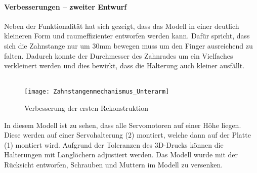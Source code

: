\documentclass[titlepage,12pt,twoside]{article}
\begin{document}
\paragraph{Verbesserungen – zweiter Entwurf}
\hfill \break
\hfill \break
Neben der Funktionalität hat sich gezeigt, dass das Modell in einer deutlich kleineren Form und raumeffizienter entworfen werden kann. Dafür spricht, dass sich die Zahnstange nur um 30mm bewegen muss um den Finger ausreichend zu falten. 
Dadurch konnte der Durchmesser des Zahnrades um ein Vielfaches verkleinert werden und dies bewirkt, dass die Halterung auch kleiner ausfällt. \\
\\
\begin{figure}[H]
	\begin{center}
		\scalebox{1}
		{\texttt{[image: Zahnstangenmechanismus\_Unterarm]}}
		\caption{Verbesserung der ersten Rekonstruktion}
		\label{fig:Zahnstangenmechanismus_Unterarm}			
	\end{center}
\end{figure}
\hfill \break
In diesem Modell ist zu sehen, dass alle Servomotoren auf einer Höhe liegen. Diese werden auf einer Servohalterung (2) montiert, welche dann auf der Platte (1) montiert wird. Aufgrund der Toleranzen des 3D-Drucks können die Halterungen mit 
Langlöchern adjustiert werden. Das Modell wurde mit der Rücksicht entworfen, Schrauben und Muttern im Modell zu versenken. \\
\\
\end{document}

